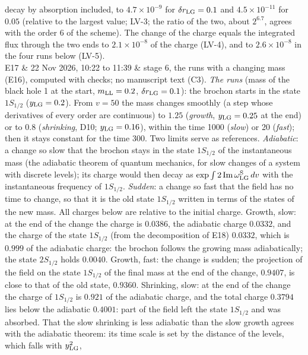 \documentclass[
  10pt,
]{article}
\begin{document}
\begin{longtable}[]
decay by absorption included, to \(4.7\times10^{-9}\) for
\(\delta r_{\rm LG}=0.1\) and \(4.5\times10^{-11}\) for \(0.05\)
(relative to the largest value; LV-3; the ratio of the two, about
\(2^{6.7}\), agrees with the order 6 of the scheme). The change of the
charge equals the integrated flux through the two ends to
\(2.1\times10^{-8}\) of the charge (LV-4), and to \(2.6\times10^{-8}\)
in the four runs below (LV-5). \\
E17 & 22 Nov 2026, 10:22 to 11:39 & stage 6, the runs with a changing
mass (E16), computed with checks; no manuscript text (C3). \emph{The
runs} (mass of the black hole 1 at the start, \(m_{\rm LL}=0.2\),
\(\delta r_{\rm LG}=0.1\)): the brochon starts in the state \(1S_{1/2}\)
(\(y_{\rm LG}=0.2\)). From \(v=50\) the mass changes smoothly (a step
whose derivatives of every order are continuous) to \(1.25\)
(\emph{growth}, \(y_{\rm LG}=0.25\) at the end) or to \(0.8\)
(\emph{shrinking}, D10; \(y_{\rm LG}=0.16\)), within the time 1000
(\emph{slow}) or 20 (\emph{fast}); then it stays constant for the time
300. Two limits serve as references. \emph{Adiabatic}: a change so slow
that the brochon stays in the state \(1S_{1/2}\) of the instantaneous
mass (the adiabatic theorem of quantum mechanics, for slow changes of a
system with discrete levels); its charge would then decay as
\(\exp\int2\,{\rm Im}\,\omega^{\rm S}_{\rm LG}\,dv\) with the
instantaneous frequency of \(1S_{1/2}\). \emph{Sudden}: a change so fast
that the field has no time to change, so that it is the old state
\(1S_{1/2}\) written in terms of the states of the new mass. All charges
below are relative to the initial charge. Growth, slow: at the end of
the change the charge is \(0.0386\), the adiabatic charge \(0.0332\),
and the charge of the state \(1S_{1/2}\) (from the decomposition of E18)
\(0.0332\), which is \(0.999\) of the adiabatic charge: the brochon
follows the growing mass adiabatically; the state \(2S_{1/2}\) holds
\(0.0040\). Growth, fast: the change is sudden; the projection of the
field on the state \(1S_{1/2}\) of the final mass at the end of the
change, \(0.9407\), is close to that of the old state, \(0.9360\).
Shrinking, slow: at the end of the change the charge of \(1S_{1/2}\) is
\(0.921\) of the adiabatic charge, and the total charge \(0.3794\) lies
below the adiabatic \(0.4001\): part of the field left the state
\(1S_{1/2}\) and was absorbed. That the slow shrinking is less adiabatic
than the slow growth agrees with the adiabatic theorem: its time scale
is set by the distance of the levels, which falls with \(y_{\rm LG}^2\),

\end{longtable}
\end{document}
